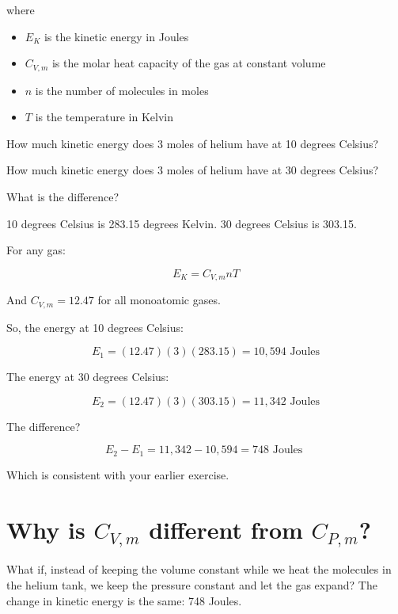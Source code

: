 where

\begin{itemize}
\item $E_K$ is the kinetic energy in Joules
\item $C_{V,m}$ is the molar heat capacity of the gas at constant volume
\item $n$ is the number of molecules in moles
\item $T$ is the temperature in Kelvin
\end{itemize}


\begin{Exercise}[title={Warming Helium Revisited},  label=warming_helium2]

How much kinetic energy does 3 moles of helium have at 10 degrees Celsius?

How much kinetic energy does 3 moles of helium have at 30 degrees Celsius?

What is the difference?

\end{Exercise}
\begin{Answer}[ref=warming_helium2]

10 degrees Celsius is 283.15 degrees Kelvin.  30 degrees Celsius is 303.15.

For any gas:

$$E_K =C_{V,m} n T$$

And $C_{V,m} = 12.47$ for all monoatomic gases.

So, the energy at 10 degrees Celsius:

$$E_1 = (12.47)(3)(283.15) = 10,594 \text{ Joules}$$

The energy at 30 degrees Celsius:

$$E_2 = (12. 47)(3)(303.15) = 11,342 \text{ Joules}$$

The difference?

$$E_2 - E_1 = 11,342 - 10,594   = 748 \text{ Joules }$$

Which is consistent with your earlier exercise.

\end{Answer}

\section{Why is $C_{V,m}$ different from $C_{P,m}$?}

What if, instead of keeping the volume constant while we heat the molecules in the helium tank,  we keep the pressure constant and let the gas expand?  
The change in kinetic energy is the same: 748 Joules.

